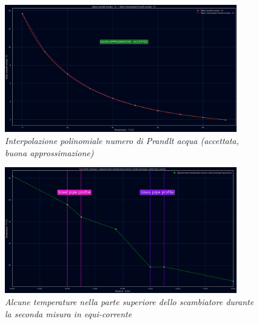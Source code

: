 \documentclass[a4paper,10pt]{article}                                                                                       %
\begin{document}
\begin{figure}[H]                                                                                                           %
  \centering                                                                                                                %
  \includegraphics[width=0.9\textwidth]{../final_doc/code_exports/imgs/water_intp_pr.png}                                   %
  \caption{\textit{Interpolazione polinomiale numero di Prandlt acqua (accettata, buona approssimazione)}}                  %
  \label{fig:water_intp_pr}                                                                                                 %
\end{figure}                                                                                                                %
\begin{figure}[H]                                                                                                           %
  \centering                                                                                                                %
  \includegraphics[width=0.9\textwidth]{../final_doc/code_exports/imgs/temp_trend.png}                                      %
  \caption{\textit{Alcune temperature nella parte superiore dello scambiatore durante la seconda misura in equi-corrente}}  %
  \label{fig:temp_trend}                                                                                                    %
\end{figure}                                                                                                                %
\end{document}
